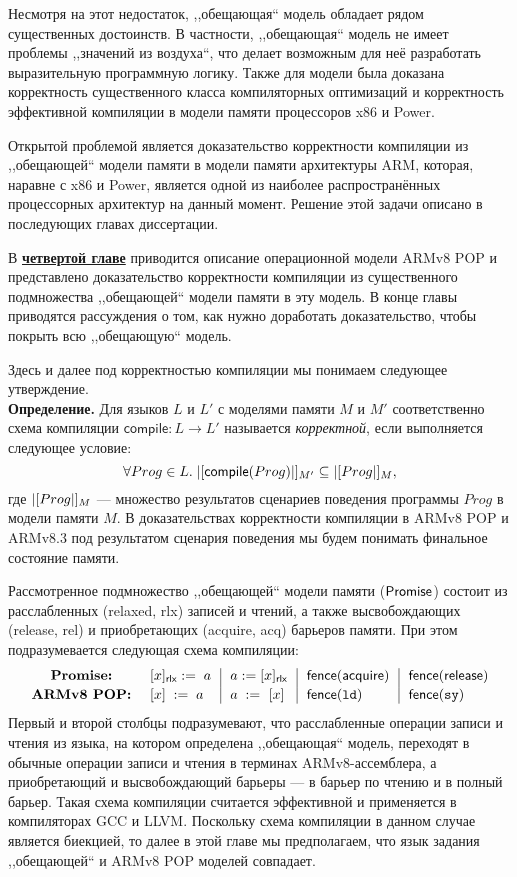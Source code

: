 Несмотря на этот недостаток, ,,обещающая`` модель обладает рядом существенных достоинств.
В частности, ,,обещающая`` модель не имеет проблемы ,,значений из воздуха``, что делает возможным для неё разработать
выразительную программную логику. Также для модели была доказана корректность существенного класса компиляторных
оптимизаций и корректность эффективной компиляции в модели памяти процессоров x86 и Power.

Открытой проблемой является доказательство корректности компиляции из ,,обещающей`` модели памяти в модели памяти архитектуры
ARM, которая, наравне с x86 и Power, является одной из наиболее распространённых процессорных архитектур на данный момент.
Решение этой задачи описано в последующих главах диссертации.

В \underline{\textbf{четвертой главе}} приводится описание операционной модели ARMv8 POP и представлено доказательство
корректности компиляции из существенного подмножества ,,обещающей`` модели памяти в эту модель.
В конце главы приводятся рассуждения о том, как нужно доработать доказательство, чтобы покрыть всю ,,обещающую`` модель.

Здесь и далее под корректностью компиляции мы понимаем следующее утверждение.\\
\textbf{Определение.} Для языков $L$ и $L'$ с моделями памяти $M$ и $M'$ соответственно схема компиляции $\textsf{compile} : L \rightarrow L'$
называется \emph{корректной}, если выполняется следующее условие:
\[ \forall Prog \in L. \; |[\textsf{compile}(Prog)|]_{M'} \subseteq |[Prog|]_{M}, \]
где $|[Prog|]_{M}$ --- множество результатов сценариев поведения программы $Prog$ в модели памяти $M$.
В доказательствах корректности компиляции в ARMv8 POP и ARMv8.3 под результатом сценария поведения мы будем
понимать финальное состояние памяти.

Рассмотренное подмножество ,,обещающей`` модели памяти ($\mathsf{Promise}$) состоит из расслабленных (relaxed, rlx) записей и чтений,
а также высвобождающих (release, rel) и приобретающих (acquire, acq) барьеров памяти. При этом подразумевается следующая
схема компиляции:
\[
  \begin{array}{c@{~~}@{~~}l@{~~}|@{~~}l@{~~}|@{~~}l@{~~}|@{~~}l}
    \textbf{Promise:}   & [x]_{\textsf{rlx}} := \; a & a := [x]_{\textsf{rlx}}  &  \acqFence & \relFence \\[2pt]
    \textbf{ARMv8 POP:} & \writeInst{x}{a}    & \readInst{a}{x}  &  \dmbLD & \dmbSY \\
  \end{array}
\]
Первый и второй столбцы подразумевают, что расслабленные операции записи и чтения из языка, на котором определена ,,обещающая`` модель,
переходят в обычные операции записи и чтения в терминах ARMv8-ассемблера, а приобретающий и высвобождающий барьеры --- в барьер
по чтению и в полный барьер. Такая схема компиляции считается эффективной и применяется в компиляторах GCC и LLVM.
Поскольку схема компиляции в данном случае является биекцией, то далее в этой главе мы предполагаем, что язык задания ,,обещающей`` и ARMv8 POP
моделей совпадает.

